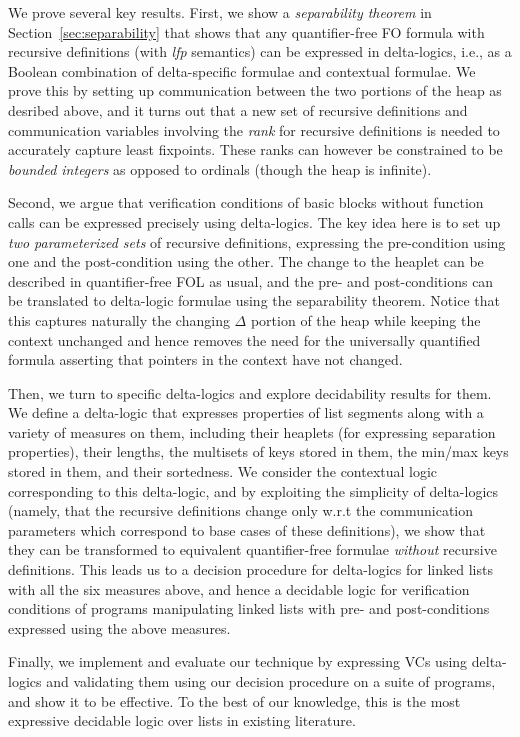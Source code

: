 We prove several key results. First, we show a \emph{separability theorem} in Section~\ref{sec:separability} that shows that any quantifier-free FO formula
with recursive definitions (with \textit{lfp} semantics) can be expressed in delta-logics, i.e., as a Boolean combination of delta-specific formulae
and contextual formulae. We prove this by setting up communication between the two portions of the heap as desribed above, and it turns out that
a new set of recursive definitions and communication variables involving the \emph{rank} for recursive definitions is
needed to accurately capture least fixpoints. These ranks can however be constrained to be \emph{bounded integers} as opposed to ordinals (though the heap is infinite). 

Second, we argue that verification conditions of basic blocks without function calls can be expressed precisely using delta-logics.
The key idea here is to set up \emph{two parameterized sets} of recursive definitions, expressing the pre-condition using
one and the post-condition using the other. The change to the heaplet can be described in quantifier-free FOL as usual, and the pre- and post-conditions can be translated to delta-logic formulae using the separability theorem. Notice that this captures naturally the changing $\Delta$ portion of the heap while keeping the context unchanged and 
hence removes the need for the universally quantified formula asserting that pointers in the context have not changed.

Then, we turn to specific delta-logics and explore decidability results for them. We define a delta-logic that expresses
properties of list segments along with a variety of measures on them, including their heaplets (for expressing separation properties), 
their lengths, the multisets of keys stored in them, the min/max keys stored in them, and their sortedness. We consider the contextual logic
corresponding to this delta-logic, and by exploiting the simplicity of delta-logics (namely, that the recursive definitions change only
w.r.t the communication parameters which correspond to base cases of these definitions), we show that they
can be transformed to equivalent quantifier-free formulae \emph{without} recursive definitions. This
leads us to a decision procedure for delta-logics for linked lists with all the six measures above, and hence a decidable logic
for verification conditions of programs manipulating linked lists with pre- and post-conditions expressed using the above measures.

Finally, we implement and evaluate our technique by expressing VCs using delta-logics and validating them using our decision procedure
on a suite of programs, and show it to be effective. 
To the best of our knowledge, this is the most expressive decidable logic over lists in existing literature. 


